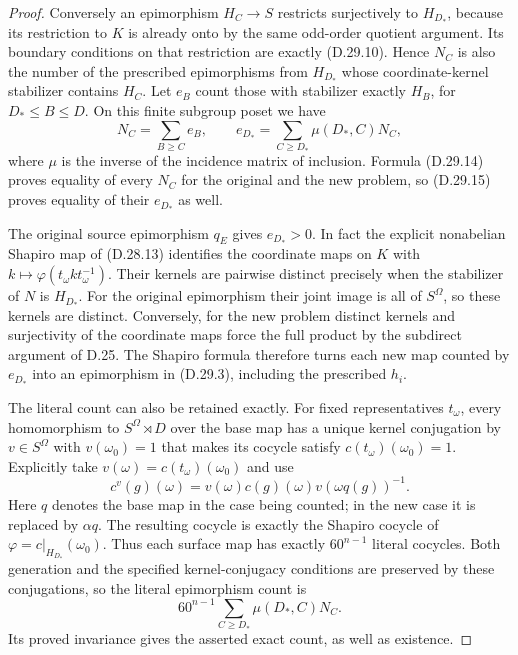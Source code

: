 \begin{proof}
Conversely an epimorphism $H_C\to S$ restricts
surjectively to $H_{D_*}$, because its restriction
to $K$ is already onto by the same odd-order
quotient argument.  Its boundary conditions on
that restriction are exactly
\textup{(D.29.10)}.  Hence $N_C$ is also the
number of the prescribed epimorphisms from
$H_{D_*}$ whose coordinate-kernel stabilizer
contains $H_C$.
Let $e_B$ count those with stabilizer exactly
$H_B$, for $D_*\leq B\leq D$.
On this finite subgroup poset we have
\[
 N_C=\sum_{B\geq C}e_B,\qquad
 e_{D_*}=\sum_{C\geq D_*}\mu(D_*,C)N_C,
 \tag{D.29.15}
\]
where $\mu$ is the inverse of the incidence matrix
of inclusion.  Formula \textup{(D.29.14)} proves
equality of every $N_C$ for the original and the
new problem, so \textup{(D.29.15)} proves equality
of their $e_{D_*}$ as well.

The original source epimorphism $q_E$ gives
$e_{D_*}>0$.  In fact the explicit nonabelian
Shapiro map of \textup{(D.28.13)} identifies
the coordinate maps on $K$ with
$k\mapsto\varphi(t_\omega k t_\omega^{-1})$.
Their kernels are pairwise distinct precisely
when the stabilizer of $N$ is $H_{D_*}$.
For the original epimorphism their joint image
is all of $S^\Omega$, so these kernels are
distinct.  Conversely, for the new problem
distinct kernels and surjectivity of the
coordinate maps force the full product by
the subdirect argument of D.25.
The Shapiro formula therefore turns each
new map counted by $e_{D_*}$ into an
epimorphism in \textup{(D.29.3)}, including
the prescribed $h_i$.

The literal count can also be retained exactly.
For fixed representatives $t_\omega$, every
homomorphism to $S^\Omega\rtimes D$ over the
base map has a unique kernel conjugation by
$v\in S^\Omega$ with $v(\omega_0)=1$
that makes its cocycle satisfy
$c(t_\omega)(\omega_0)=1$.
Explicitly take
$v(\omega)=c(t_\omega)(\omega_0)$ and use
\[
 c^v(g)(\omega)=v(\omega)c(g)(\omega)
                         v(\omega q(g))^{-1}.
 \tag{D.29.16}
\]
Here $q$ denotes the base map in the case being
counted; in the new case it is replaced by $\alpha q$.
The resulting cocycle is exactly the Shapiro
cocycle of $\varphi=c|_{H_{D_*}}(\omega_0)$.
Thus each surface map has exactly $60^{n-1}$
literal cocycles.  Both generation and the
specified kernel-conjugacy conditions are
preserved by these conjugations, so the
literal epimorphism count is
\[
                 60^{n-1}
                 \sum_{C\geq D_*}\mu(D_*,C)N_C.
 \tag{D.29.17}
\]
Its proved invariance gives the asserted exact
count, as well as existence.


\end{proof}
